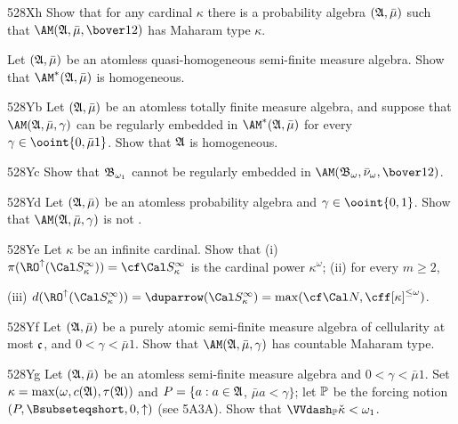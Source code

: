 {

\spheader 528Xh
Show that for any cardinal $\kappa$ there is a
probability algebra $(\frak A,\bar\mu)$ such that
$\AM(\frak A,\bar\mu,\bover12)$ has Maharam type $\kappa$.

Let $(\frak A,\bar\mu)$ be an atomless quasi-homogeneous
semi-finite measure algebra.   Show that
$\AM^*(\frak A,\bar\mu)$ is homogeneous.

\spheader 528Yb Let $(\frak A,\bar\mu)$ be an atomless
totally finite
measure algebra, and suppose that $\AM(\frak A,\bar\mu,\gamma)$ can be
regularly embedded in $\AM^*(\frak A,\bar\mu)$ for every
$\gamma\in\ooint{0,\bar\mu 1}$.   Show that $\frak A$ is homogeneous.

\spheader 528Yc Show that $\frak B_{\omega_1}$ cannot
be regularly embedded in
$\AM(\frak B_{\omega},\bar\nu_{\omega},\bover12)$.

\spheader 528Yd
 Let $(\frak A,\bar\mu)$ be an atomless
probability algebra and $\gamma\in\ooint{0,1}$.   Show that
$\AM(\frak A,\bar\mu,\gamma)$ is not \wsid.

\spheader 528Ye Let $\kappa$ be an infinite cardinal.   Show that
(i) $\pi(\RO^{\uparrow}(\Cal S_{\kappa}^{\infty}))
=\cf\Cal S_{\kappa}^{\infty}$
is the cardinal power $\kappa^{\omega}$;   (ii) for every $m\ge 2$,


\noindent (iii) $d(\RO^{\uparrow}(\Cal S_{\kappa}^{\infty}))
=\duparrow(\Cal S_{\kappa}^{\infty})
=\max(\cf\Cal N,\cff[\kappa]^{\le\omega})$.

\spheader 528Yf
Let $(\frak A,\bar\mu)$ be a purely atomic semi-finite
measure algebra of cellularity
at most $\frak c$, and $0<\gamma<\bar\mu 1$.   Show that
$\AM(\frak A,\bar\mu,\gamma)$ has countable Maharam type.

\spheader 528Yg Let $(\frak A,\bar\mu)$ be an atomless
semi-finite measure algebra and $0<\gamma<\bar\mu 1$.   Set
$\kappa=\max(\omega,c(\frak A),\tau(\frak A))$ and
$P=\{a:a\in\frak A$, $\bar\mu a<\gamma\}$;  let $\Bbb P$ be the forcing
notion $(P,\Bsubseteqshort,0,\uparrow)$ (see 5A3A).   Show that
$\VVdash_{\Bbb P}\check\kappa<\omega_1$.

}
